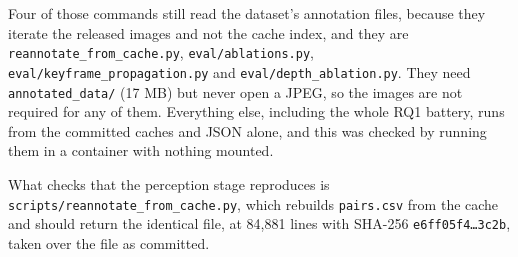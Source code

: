 Four of those commands still read the dataset's annotation files, because they iterate the released images and not the cache index, and they are \texttt{reannotate\_\allowbreak{}from\_\allowbreak{}cache.py}, \texttt{eval/ablations.py}, \texttt{eval/keyframe\_\allowbreak{}propagation.py} and \texttt{eval/depth\_\allowbreak{}ablation.py}. They need \texttt{annotated\_\allowbreak{}data/} (17 MB) but never open a JPEG, so the images are not required for any of them. Everything else, including the whole RQ1 battery, runs from the committed caches and JSON alone, and this was checked by running them in a container with nothing mounted.

What checks that the perception stage reproduces is \texttt{scripts/reannotate\_\allowbreak{}from\_\allowbreak{}cache.py}, which rebuilds \texttt{pairs.csv} from the cache and should return the identical file, at 84,881 lines with SHA-256 \texttt{e6ff05f4\ldots{}3c2b}, taken over the file as committed.

